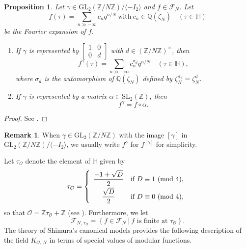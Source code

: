 \documentclass[reqno,11pt]{article}
\newcommand{\Mod}[1]{\ (\textup{mod}\ #1)}
\theoremstyle{plain} %
\newtheorem{proposition}[theorem]{\indent\sc Proposition}
\theoremstyle{definition} %
\newtheorem{remark}[theorem]{\indent\sc Remark}
\begin{document}
\begin{proposition}\label{GFaction}
Let $\gamma\in\mathrm{GL}_2(\mathbb{Z}/N\mathbb{Z})/\langle-I_2\rangle$
and $f\in\mathcal{F}_N$. Let
\begin{equation*}
f(\tau)=\sum_{n\gg-\infty}c_nq^{n/N}~\textrm{with}~c_n\in\mathbb{Q}(\zeta_N)
\quad(\tau\in\mathbb{H}) 
\end{equation*}
be the Fourier expansion of $f$. 
\begin{enumerate}
\item[\textup{(i)}] If $\gamma$ is represented by $\begin{bmatrix}1&0\\0&d\end{bmatrix}$ 
with $d\in(\mathbb{Z}/N\mathbb{Z})^\times$, then 
\begin{equation*}
f^\gamma(\tau)=\sum_{n\gg-\infty}c_n^{\sigma_d}q^{n/N}\quad(\tau\in\mathbb{H}),
\end{equation*}
where $\sigma_d$ is the automorphism of $\mathbb{Q}(\zeta_N)$ defined by $\zeta_N^{\sigma_d}=\zeta_N^d$. 
\item[\textup{(ii)}] If $\gamma$ is represented by a matrix $\alpha\in\mathrm{SL}_2(\mathbb{Z})$, then
\begin{equation*}
f^\gamma=f\circ\alpha. 
\end{equation*}
\end{enumerate}
\end{proposition}
\begin{proof}
See \cite[Theorem 6.6 (3) and Proposition 6.21 (3)]{Shimura}. 
\end{proof}

\begin{remark}
When $\gamma\in\mathrm{GL}_2(\mathbb{Z}/N\mathbb{Z})$
with the image $[\gamma]$ in $\mathrm{GL}_2(\mathbb{Z}/N\mathbb{Z})/
\langle-I_2\rangle$, we usually write
$f^\gamma$ for $f^{[\gamma]}$ for simplicity. 
\end{remark}

Let $\tau_\mathcal{O}$ denote the element of $\mathbb{H}$ given by
\begin{equation*}
\tau_\mathcal{O}=
\left\{\begin{array}{cl}
\displaystyle\frac{-1+\sqrt{D}}{2}
& \text{if}~D\equiv1\Mod{4},\vspace{0.1cm}\\
\displaystyle\frac{\sqrt{D}}{2}& \text{if}~D\equiv0\Mod{4}, 
\end{array}\right.
\end{equation*}
so that $\mathcal{O}=\mathbb{Z}\tau_\mathcal{O}+\mathbb{Z}$
(see \cite[Lemma 7.2]{Cox}). 
Furthermore, we let
\begin{equation*}
\mathcal{F}_{N,\,\tau_\mathcal{O}}=\left\{f\in\mathcal{F}_N~|~
\text{$f$ is finite at $\tau_\mathcal{O}$}\right\}.
\end{equation*}
The theory 
of Shimura's canonical models provides the following 
description of the field $K_{\mathcal{O},\,N}$
in terms of special values of modular functions.
\end{document}

